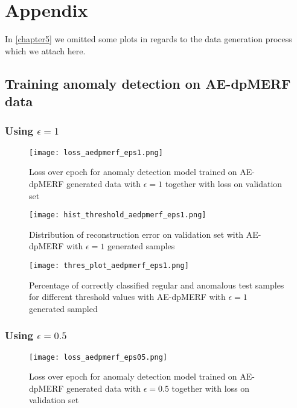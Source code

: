 \section*{Appendix}

In \cref{chapter5} we omitted some plots in regards to the data generation process which we attach here.

\subsection*{Training anomaly detection on AE-dpMERF data}

\subsubsection*{Using $\epsilon=1$}

\begin{figure}[H]
    \centering
    \texttt{[image: loss\_aedpmerf\_eps1.png]}
    \caption{Loss over epoch for anomaly detection model trained on AE-dpMERF generated data with $\epsilon=1$ together with loss on validation set}
\end{figure}

\begin{figure}[h]
    \begin{minipage}[b]{0.45\textwidth}
        \centering
        \texttt{[image: hist\_threshold\_aedpmerf\_eps1.png]}
        \caption{Distribution of reconstruction error on validation set with AE-dpMERF with $\epsilon=1$ generated samples}
    
    \end{minipage}
    \begin{minipage}[b]{0.45\textwidth}
        \centering
        \texttt{[image: thres\_plot\_aedpmerf\_eps1.png]}
        \caption{Percentage of correctly classified regular and anomalous test samples for different threshold values with AE-dpMERF with $\epsilon=1$ generated sampled}
        \label{fig:thres_aegwan}
    \end{minipage}
\end{figure}

\subsubsection*{Using $\epsilon=0.5$}

\begin{figure}[H]
    \centering
    \texttt{[image: loss\_aedpmerf\_eps05.png]}
    \caption{Loss over epoch for anomaly detection model trained on AE-dpMERF generated data with $\epsilon=0.5$ together with loss on validation set}
\end{figure}

